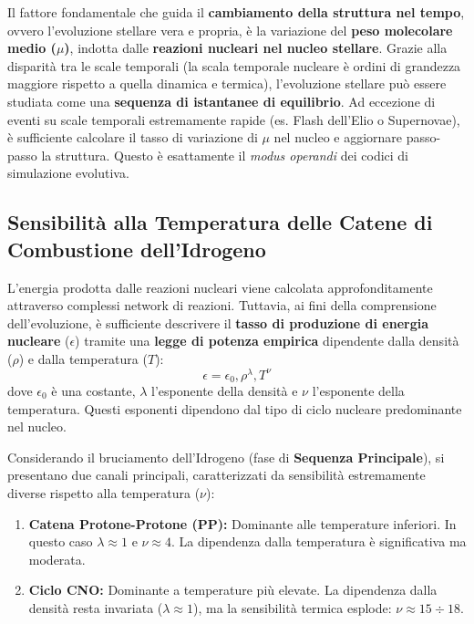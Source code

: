 Il fattore fondamentale che guida il \textbf{cambiamento della struttura nel tempo}, ovvero l'evoluzione stellare vera e propria, è la variazione del \textbf{peso molecolare medio ($\mu$)}, indotta dalle \textbf{reazioni nucleari nel nucleo stellare}.
Grazie alla disparità tra le scale temporali (la scala temporale nucleare è ordini di grandezza maggiore rispetto a quella dinamica e termica), l'evoluzione stellare può essere studiata come una \textbf{sequenza di istantanee di equilibrio}. Ad eccezione di eventi su scale temporali estremamente rapide (es. Flash dell'Elio o Supernovae), è sufficiente calcolare il tasso di variazione di $\mu$ nel nucleo e aggiornare passo-passo la struttura. Questo è esattamente il \textit{modus operandi} dei codici di simulazione evolutiva.

\subsection{Sensibilità alla Temperatura delle Catene di Combustione dell'Idrogeno}

L'energia prodotta dalle reazioni nucleari viene calcolata approfonditamente attraverso complessi network di reazioni. Tuttavia, ai fini della comprensione dell'evoluzione, è sufficiente descrivere il \textbf{tasso di produzione di energia nucleare} ($\epsilon$) tramite una \textbf{legge di potenza empirica} dipendente dalla densità ($\rho$) e dalla temperatura ($T$):
\begin{equation}
\epsilon = \epsilon_0 , \rho^{\lambda} , T^{\nu}
\end{equation}
dove $\epsilon_0$ è una costante, $\lambda$ l'esponente della densità e $\nu$ l'esponente della temperatura. Questi esponenti dipendono dal tipo di ciclo nucleare predominante nel nucleo.

Considerando il bruciamento dell'Idrogeno (fase di \textbf{Sequenza Principale}), si presentano due canali principali, caratterizzati da sensibilità estremamente diverse rispetto alla temperatura ($\nu$):

\begin{enumerate}
\item \textbf{Catena Protone-Protone (PP):} Dominante alle temperature inferiori. In questo caso $\lambda \approx 1$ e \textbf{$\nu \approx 4$}. La dipendenza dalla temperatura è significativa ma moderata.


\item \textbf{Ciclo CNO:} Dominante a temperature più elevate. La dipendenza dalla densità resta invariata ($\lambda \approx 1$), ma la sensibilità termica esplode: \textbf{$\nu \approx 15 \div 18$}.



\end{enumerate}

